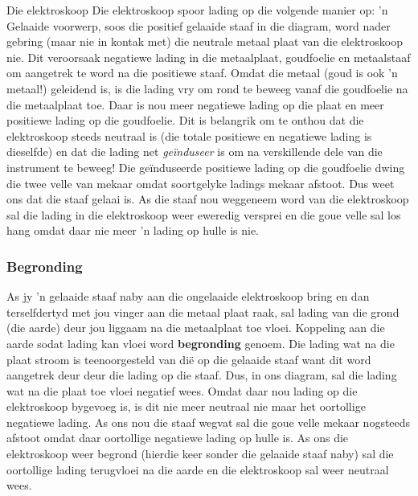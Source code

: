 \begin{i_experiment}{Die elektroskoop}
Die elektroskoop spoor lading op die volgende manier op: 'n Gelaaide voorwerp, soos die positief gelaaide staaf in die diagram, word nader gebring (maar nie in kontak met) die neutrale metaal plaat van die elektroskoop nie. Dit veroorsaak negatiewe lading in die metaalplaat, goudfoelie en metaalstaaf om aangetrek te word na die positiewe staaf. Omdat die metaal (goud is ook 'n metaal!) geleidend is, is die lading vry om rond te beweeg vanaf die goudfoelie na die metaalplaat toe. Daar is nou meer negatiewe lading op die plaat en meer positiewe lading op die goudfoelie. Dit is belangrik om te onthou dat die elektroskoop steeds neutraal is (die totale positiewe en negatiewe lading is dieselfde) en dat die lading net \textsl{ge\"induseer} is om na verskillende dele van die instrument te beweeg! Die ge\"induseerde positiewe lading op die goudfoelie dwing die twee velle van mekaar omdat soortgelyke ladings mekaar afstoot. Dus weet ons dat die staaf gelaai is. As die staaf nou weggeneem word van die elektroskoop sal die lading in die elektroskoop weer eweredig versprei en die goue velle sal los hang omdat daar nie meer 'n lading op hulle is nie. \par




\subsubsection{Begronding}
\nopagebreak

As jy 'n gelaaide staaf naby aan die ongelaaide elektroskoop bring en dan terselfdertyd met jou vinger aan die metaal plaat raak, sal lading van die grond (die aarde) deur jou liggaam na die metaalplaat toe vloei. Koppeling aan die aarde sodat lading kan vloei word \textbf{begronding} genoem. Die lading wat na die plaat stroom is teenoorgesteld van di\"e op die gelaaide staaf want dit word aangetrek deur deur die lading op die staaf. Dus, in ons diagram, sal die lading wat na die plaat toe vloei negatief wees. Omdat daar nou lading op die elektroskoop bygevoeg is, is dit nie meer neutraal nie maar het oortollige negatiewe lading. As ons nou die staaf wegvat sal die goue velle mekaar nogsteeds afstoot omdat daar oortollige negatiewe lading op hulle is. As ons die elektroskoop weer begrond (hierdie keer sonder die gelaaide staaf naby) sal die oortollige lading terugvloei na die aarde en die elektroskoop sal weer neutraal wees. \par


\end{i_experiment}
